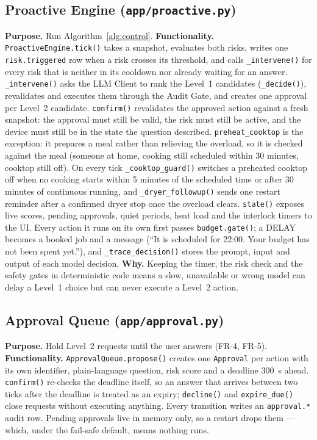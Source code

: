 \documentclass[conference]{IEEEtran}
\begin{document}
\subsection{Proactive Engine (\texttt{app/proactive.py})}
\textbf{Purpose.} Run Algorithm~\ref{alg:control}.
\textbf{Functionality.} \texttt{ProactiveEngine.tick()} takes a snapshot, evaluates both risks, writes one \texttt{risk.triggered} row when a risk crosses its threshold, and calls \texttt{\_intervene()} for every risk that is neither in its cooldown nor already waiting for an answer. \texttt{\_intervene()} asks the LLM Client to rank the Level~1 candidates (\texttt{\_decide()}), revalidates and executes them through the Audit Gate, and creates one approval per Level~2 candidate. \texttt{confirm()} revalidates the approved action against a fresh snapshot: the approval must still be valid, the risk must still be active, and the device must still be in the state the question described. \texttt{preheat\_cooktop} is the exception: it prepares a meal rather than relieving the overload, so it is checked against the meal (someone at home, cooking still scheduled within 30 minutes, cooktop still off). On every tick \texttt{\_cooktop\_guard()} switches a preheated cooktop off when no cooking starts within 5 minutes of the scheduled time or after 30 minutes of continuous running, and \texttt{\_dryer\_followup()} sends one restart reminder after a confirmed dryer stop once the overload clears. \texttt{state()} exposes live scores, pending approvals, quiet periods, heat load and the interlock timers to the UI.
Every action it runs on its own first passes \texttt{budget.gate()}; a DELAY becomes a booked job and a message (``It is scheduled for 22:00. Your budget has not been spent yet.''), and \texttt{\_trace\_decision()} stores the prompt, input and output of each model decision.
\textbf{Why.} Keeping the timer, the risk check and the safety gates in deterministic code means a slow, unavailable or wrong model can delay a Level~1 choice but can never execute a Level~2 action.

\subsection{Approval Queue (\texttt{app/approval.py})}
\textbf{Purpose.} Hold Level~2 requests until the user answers (FR-4, FR-5).
\textbf{Functionality.} \texttt{ApprovalQueue.propose()} creates one \texttt{Approval} per action with its own identifier, plain-language question, risk score and a deadline 300~s ahead. \texttt{confirm()} re-checks the deadline itself, so an answer that arrives between two ticks after the deadline is treated as an expiry; \texttt{decline()} and \texttt{expire\_due()} close requests without executing anything. Every transition writes an \texttt{approval.*} audit row. Pending approvals live in memory only, so a restart drops them --- which, under the fail-safe default, means nothing runs.
\end{document}
